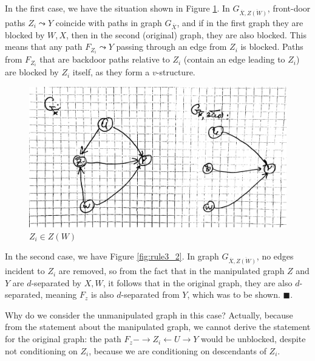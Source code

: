 \documentclass[fleqn]{article}
\numberwithin{equation}{section}
\numberwithin{theorem}{section}
\numberwithin{figure}{section}
\numberwithin{lemma}{section}
\numberwithin{corollary}{section}
\begin{document}
In the first case, we have the situation shown in Figure \ref{fig:rule3}. In $G_{\overline{X},\overline{Z(W)}}$, front-door paths $Z_i \leadsto Y$ coincide with paths in graph $G_{\overline{X}}$, and if in the first graph they are blocked by $W, X$, then in the second (original) graph, they are also blocked. This means that any path $F_{Z_i} \leadsto Y$ passing through an edge from $Z_i$ is blocked. Paths from $F_{Z_i}$ that are backdoor paths relative to $Z_i$ (contain an edge leading to $Z_i$) are blocked by $Z_i$ itself, as they form a $v$-structure.

\begin{figure}[h]
	\begin{center}
		\includegraphics[scale=0.1]{imgs/img21.png}
	\end{center}
	\caption{$Z_i \in Z(W)$}
	\label{fig:rule3}
\end{figure}

In the second case, we have Figure \ref{fig:rule3_2}. In graph $G_{\overline{X},\overline{Z(W)}}$, no edges incident to $Z_i$ are removed, so from the fact that in the manipulated graph $Z$ and $Y$ are $d$-separated by $X,W$, it follows that in the original graph, they are also $d$-separated, meaning $F_z$ is also $d$-separated from $Y$, which was to be shown. $\blacksquare$.

Why do we consider the unmanipulated graph in this case? Actually, because from the statement about the manipulated graph, we cannot derive the statement for the original graph: the path $F_z -\rightarrow Z_i \leftarrow U \rightarrow Y$ would be unblocked, despite not conditioning on $Z_i$, because we are conditioning on descendants of $Z_i$.
\end{document}

